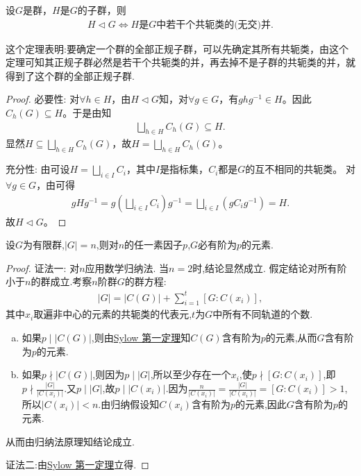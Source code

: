 \documentclass[../../main.tex]{subfiles}%
\begin{document}
\begin{theorem}\label{theorem:正规子群都是共轭类的并}
设$G$是群，$H$是$G$的子群，则
\begin{align*}
H\lhd G\Longleftrightarrow H\text{是}G\text{中若干个共轭类的(无交)并}.
\end{align*}
\end{theorem}
\begin{remark}
这个定理表明:要确定一个群的全部正规子群，可以先确定其所有共轭类，由这个定理可知其正规子群必然是若干个共轭类的并，再去掉不是子群的共轭类的并，就得到了这个群的全部正规子群.
\end{remark}
\begin{proof}

{\heiti 必要性:} 对$\forall h\in H$，由$H\lhd G$知，对$\forall g\in G$，有$ghg^{-1}\in H$。因此$C_h(G)\subseteq H$。于是由知
\begin{align*}
\bigsqcup\limits_{h\in H}C_h(G)\subseteq H.
\end{align*}
显然$H\subseteq \bigsqcup\limits_{h\in H}C_h(G)$，故$H=\bigsqcup\limits_{h\in H}C_h(G)$。

{\heiti 充分性:} 由可设$H=\bigsqcup\limits_{i\in I}C_i$，其中$I$是指标集，$C_i$都是$G$的互不相同的共轭类。
对$\forall g\in G$，由可得
\begin{align*}
gHg^{-1}=g\left( \bigsqcup\limits_{i\in I}C_i \right) g^{-1}=\bigsqcup\limits_{i\in I}\left( gC_ig^{-1} \right)=H.
\end{align*}
故$H\lhd G$。
\end{proof}

\begin{theorem}[Cauchy定理]\label{theorem:抽象代数--Cauchy定理}
设$G$为有限群,$|G|=n$,则对$n$的任一素因子$p$,$G$必有阶为$p$的元素.
\end{theorem}
\begin{proof}

{\color{blue}证法一:}
对$n$应用数学归纳法.
当$n=2$时,结论显然成立.
假定结论对所有阶小于$n$的群成立.考察$n$阶群$G$的群方程:
\begin{align*}
|G| = |C(G)| + \sum_{i=1}^{t}[G:C(x_i)],
\end{align*}
其中$x_i$取遍非中心的元素的共轭类的代表元,$t$为$G$中所有不同轨道的个数.
\begin{enumerate}[(a)]
\item 如果$p\mid |C(G)|$,则由\hyperref[theorem:Sylow 第一定理]{Sylow 第一定理}知$C(G)$含有阶为$p$的元素,从而$G$含有阶为$p$的元素.

\item 如果$p\nmid |C(G)|$,则因为$p\mid |G|$,所以至少存在一个$x_i$,使$p\nmid [G:C(x_i)]$,即$p\nmid \frac{|G|}{|C(x_i)|}$.又$p\mid |G|$,故$p\mid |C(x_i)|$.因为$\frac{n}{|C(x_i)|}=\frac{|G|}{|C(x_i)|}=[G:C(x_i)]>1$,所以$|C(x_i)|<n$.由归纳假设知$C(x_i)$含有阶为$p$的元素,因此$G$含有阶为$p$的元素.
\end{enumerate}
从而由归纳法原理知结论成立.

{\color{blue}证法二:}由\hyperref[theorem:Sylow 第一定理]{Sylow 第一定理}立得.
\end{proof}
\end{document}

